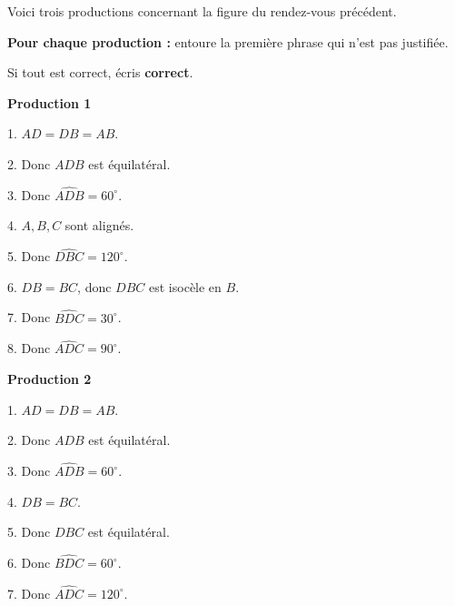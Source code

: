 \documentclass[10pt,a4paper]{article}
\newcommand{\grandeactivite}[2]{%
\begin{tcolorbox}[
  enhanced,
  colback=white,
  colframe=NeutreC!55,
  boxrule=0.6pt,
  arc=1.5mm,
  left=4mm,
  right=4mm,
  top=2.5mm,
  bottom=2.5mm,
  title={\sffamily\bfseries\color{TitreC}#1},
  coltitle=TitreC,
  colbacktitle=NeutreBg
]
#2
\end{tcolorbox}
}
\begin{document}
\grandeactivite{A. Trouver la première erreur}{

Voici trois productions concernant la figure du rendez-vous précédent.

\medskip

\textbf{Pour chaque production :}
entoure la première phrase qui n'est pas justifiée.

Si tout est correct, écris \textbf{correct}.

\vspace{0.25cm}

\begin{minipage}[t]{0.315\linewidth}

\begin{tcolorbox}[
  colback=white,
  colframe=NeutreC!45,
  boxrule=0.5pt,
  height=7.2cm
]
\textbf{Production 1}

\medskip

1. \(AD=DB=AB\).

2. Donc \(ADB\) est équilatéral.

3. Donc \(\widehat{ADB}=60^\circ\).

4. \(A,B,C\) sont alignés.

5. Donc \(\widehat{DBC}=120^\circ\).

6. \(DB=BC\), donc \(DBC\) est isocèle en \(B\).

7. Donc \(\widehat{BDC}=30^\circ\).

8. Donc \(\widehat{ADC}=90^\circ\).
\end{tcolorbox}

\end{minipage}
\hfill
\begin{minipage}[t]{0.315\linewidth}

\begin{tcolorbox}[
  colback=white,
  colframe=NeutreC!45,
  boxrule=0.5pt,
  height=7.2cm
]
\textbf{Production 2}

\medskip

1. \(AD=DB=AB\).

2. Donc \(ADB\) est équilatéral.

3. Donc \(\widehat{ADB}=60^\circ\).

4. \(DB=BC\).

5. Donc \(DBC\) est équilatéral.

6. Donc \(\widehat{BDC}=60^\circ\).

7. Donc \(\widehat{ADC}=120^\circ\).
\end{tcolorbox}

\end{minipage}
\hfill
\begin{minipage}[t]{0.315\linewidth}


\end{minipage}}
\end{document}
